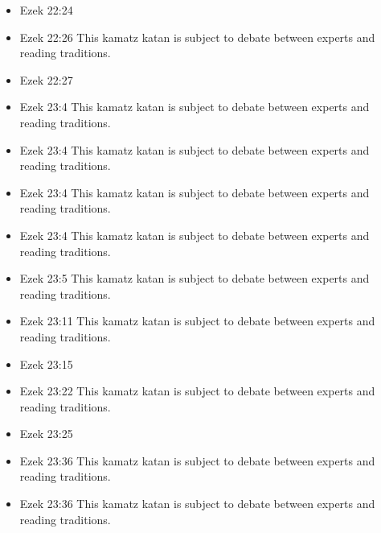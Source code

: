 \documentclass[14pt]{book}
\begin{document}
\begin{multicols}{2}
\begin{itemize}
												\item Ezek 22:24
												
												\item Ezek 22:26 This kamatz katan is subject to debate between experts and reading traditions.
												
												\item Ezek 22:27
												
												\item Ezek 23:4 This kamatz katan is subject to debate between experts and reading traditions.
												
												\item Ezek 23:4 This kamatz katan is subject to debate between experts and reading traditions.
												
												\item Ezek 23:4 This kamatz katan is subject to debate between experts and reading traditions.
												
												\item Ezek 23:4 This kamatz katan is subject to debate between experts and reading traditions.
												
												\item Ezek 23:5 This kamatz katan is subject to debate between experts and reading traditions.
												
												\item Ezek 23:11 This kamatz katan is subject to debate between experts and reading traditions.
												
												\item Ezek 23:15
												
												\item Ezek 23:22 This kamatz katan is subject to debate between experts and reading traditions.
												
												\item Ezek 23:25
												
												\item Ezek 23:36 This kamatz katan is subject to debate between experts and reading traditions.
												
												\item Ezek 23:36 This kamatz katan is subject to debate between experts and reading traditions.
												

\end{itemize}
\end{multicols}
\end{document}
